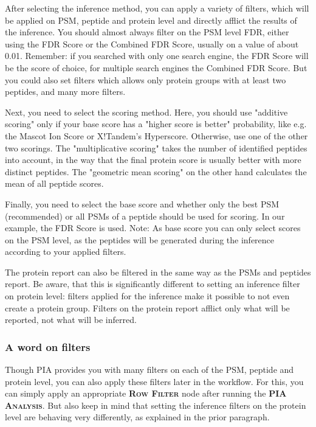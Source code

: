 \documentclass[a4paper,11pt,twoside]{article}
\newcommand{\knimenode}[1]{{\scshape\bfseries #1}}
\begin{document}
After selecting the inference method, you can apply a variety of filters, which
will be applied on PSM, peptide and protein level and directly afflict the
results of the inference. You should almost always filter on the PSM level FDR,
either using the FDR Score or the Combined FDR Score, usually on a value of about
0.01. Remember: if you searched with only one search engine, the FDR Score will
be the score of choice, for multiple search engines the Combined FDR Score. But
you could also set filters which allows only protein groups with at least two
peptides, and many more filters.

Next, you need to select the scoring method. Here, you should use "additive
scoring" only if your base score has a "higher score is better" probability,
like e.g. the Mascot Ion Score or X!Tandem's Hyperscore. Otherwise, use one of
the other two scorings. The "multiplicative scoring" takes the number of
identified peptides into account, in the way that the final protein score is
usually better with more distinct peptides. The "geometric mean scoring" on the
other hand calculates the mean of all peptide scores.

Finally, you need to select the base score and whether only the best PSM
(recommended) or all PSMs of a peptide should be used for scoring. In our
example, the FDR Score is used. Note: As base score you can only
select scores on the PSM level, as the peptides will be generated during the
inference according to your applied filters.

The protein report can also be filtered in the same way as the PSMs and
peptides report. Be aware, that this is significantly different to setting an
inference filter on protein level: filters applied for the inference make it
possible to not even create a protein group. Filters on the protein report
afflict only what will be reported, not what will be inferred.


\subsubsection{A word on filters}

Though PIA provides you with many filters on each of the PSM, peptide and
protein level, you can also apply these filters later in the workflow. For
this, you can simply apply an appropriate \knimenode{Row Filter} node after
running the \knimenode{PIA Analysis}. But also keep in mind that setting the
inference filters on the protein level are behaving very differently, as
explained in the prior paragraph.
\end{document}
